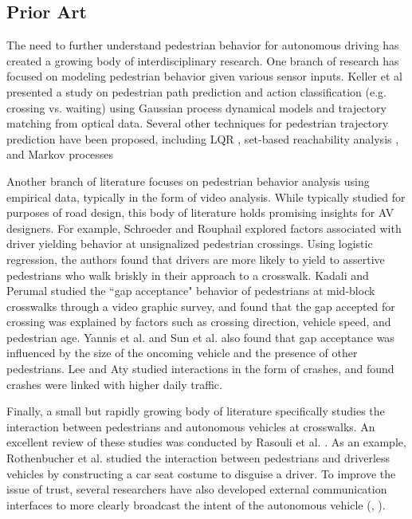 \documentclass[letterpaper, 10 pt, conference]{ieeeconf}  %
\begin{document}
\subsection{Prior Art}

The need to further understand pedestrian behavior for autonomous driving has created a growing body of interdisciplinary research. One branch of research has focused on modeling pedestrian behavior given various sensor inputs. Keller et al \cite{Keller2014} presented a study on pedestrian path prediction and action classification (e.g. crossing vs. waiting) using Gaussian process dynamical models and trajectory matching from optical data. Several other techniques for pedestrian trajectory prediction have been proposed, including LQR \cite{Batkovic}, set-based reachability analysis \cite{Koschi2018}, and Markov processes \cite{Karasev2016} 

Another branch of literature focuses on pedestrian behavior analysis using empirical data, typically in the form of video analysis. While typically studied for purposes of road design, this body of literature holds promising insights for AV designers. For example, Schroeder and Rouphail \cite{Schroeder2011} explored factors associated with driver yielding behavior at unsignalized pedestrian crossings. Using logistic regression, the authors found that drivers are more likely to yield to assertive pedestrians who walk briskly in their approach to a crosswalk. Kadali and Perumal \cite{RaghuramKadali2012} studied the ``gap acceptance" behavior of pedestrians at mid-block crosswalks through a video graphic survey, and found that the gap accepted for crossing was explained by factors such as crossing direction, vehicle speed, and pedestrian age. Yannis et al. \cite{Yannis2013} and Sun et al.\cite{Sun2002} also found that gap acceptance was influenced by the size of the oncoming vehicle and the presence of other pedestrians.  Lee and Aty \cite{Lee2005} studied interactions in the form of crashes, and found crashes were linked with higher daily traffic. 

Finally, a small but rapidly growing body of literature specifically studies the interaction between pedestrians and autonomous vehicles at crosswalks. An excellent review of these studies was conducted by Rasouli et al. \cite{Rasouli}. As an example, Rothenbucher et al. \cite{Rothenbucher2016} studied the interaction between pedestrians and driverless vehicles by constructing a car seat costume to disguise a driver. To improve the issue of trust, several researchers have also developed external communication interfaces to more clearly broadcast the intent of the autonomous vehicle (\cite{Matthews}, \cite{Lagstrom2015}). 
\end{document}
